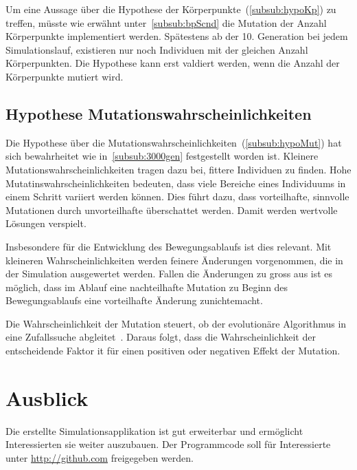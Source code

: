       Um eine Aussage über die Hypothese der Körperpunkte~(\vref{subsub:hypoKp}) zu treffen,
      müsste wie erwähnt unter~\vref{subsub:bpScnd} die Mutation der Anzahl Körperpunkte implementiert werden.
      Spätestens ab der 10. Generation bei jedem Simulationslauf,
      existieren nur noch Individuen mit der gleichen Anzahl Körperpunkten.
      Die Hypothese kann erst valdiert werden, wenn die Anzahl der Körperpunkte mutiert wird.

    \subsection{Hypothese Mutationswahrscheinlichkeiten}

      Die Hypothese über die Mutationswahrscheinlichkeiten~(\vref{subsub:hypoMut}) hat sich bewahrheitet
      wie in~\vref{subsub:3000gen} festgestellt worden ist.
      Kleinere Mutationswahrscheinlichkeiten tragen dazu bei, fittere Individuen zu finden.
      Hohe Mutatinswahrscheinlichkeiten bedeuten,
      dass viele Bereiche eines Individuums in einem Schritt variiert werden können.
      Dies führt dazu, dass vorteilhafte, sinnvolle Mutationen durch unvorteilhafte überschattet werden.
      Damit werden wertvolle Lösungen verspielt.

      \smallskip

      Insbesondere für die Entwicklung des Bewegungsablaufs ist dies relevant.
      Mit kleineren Wahrscheinlichkeiten werden feinere Änderungen vorgenommen,
      die in der Simulation ausgewertet werden.
      Fallen die Änderungen zu gross aus ist es möglich, dass im Ablauf eine nachteilhafte Mutation
      zu Beginn des Bewegungsablaufs eine vorteilhafte Änderung zunichtemacht.

      \smallskip

      Die Wahrscheinlichkeit der Mutation steuert,
      ob der evolutionäre Algorithmus in eine Zufallssuche abgleitet~\cite{Sampson1976}.
      Daraus folgt, dass die Wahrscheinlichkeit der entscheidende Faktor it für einen positiven oder
      negativen Effekt der Mutation.

  \section{Ausblick\label{sec:ausblick}}

    Die erstellte Simulationsapplikation ist gut erweiterbar und ermöglicht Interessierten sie weiter auszubauen.
    Der Programmcode soll für Interessierte unter \url{http://github.com} freigegeben werden.

